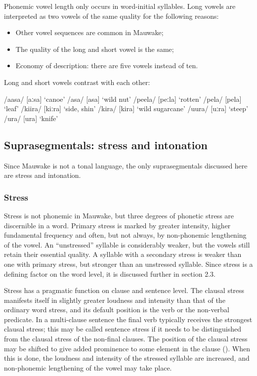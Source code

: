 Phonemic vowel length only occurs in word-initial syllables.  Long vowels are interpreted as two vowels of the same quality for the following reasons:


\begin{itemize}
\item Other vowel sequences are common in Mauwake;
\item The quality of the long and short vowel is the same;
\item Economy of description: there are five vowels instead of ten.
\end{itemize}

Long and short vowels contrast with each other:

\ea
\ea
/aasa/  [{{\textprimstress}aːsa}]  `canoe'
\ex
/asa/  [a{{\textprimstress}sa}]  `wild  nut'
\ex
/peela/  [{{\textprimstress}peːla}]  `rotten'
\ex
/pela/  [pe{{\textprimstress}la}]  `leaf'
\ex
/kiira/  [{{\textprimstress}kiːr}a]  `side, shin'
\ex
/kira/  [ki{{\textprimstress}ra}]  `wild sugarcane'
\ex
/{\textphi}uura/  [{{\textprimstress}}{\textphi}uːra]  `steep'
\ex
/{\textphi}ura/  [{\textphi}u{{\textprimstress}ra}]  `knife'
\z
\z

\subsection{Suprasegmentals: stress and intonation}\label{sec:2:y:x}


Since Mauwake is not a tonal language, the only suprasegmentals discussed here are stress and intonation.

\subsubsection{Stress}\label{sec:2:z:y:x}


Stress is not phonemic in Mauwake, but three degrees of phonetic stress are discernible in a word.  Primary stress is marked by greater intensity, higher fundamental frequency and often, but not always, by non-phonemic lengthening of the vowel.  An ``unstressed'' syllable is considerably weaker, but the vowels still retain their essential quality.  A syllable with a secondary stress is weaker than one with primary stress, but stronger than an unstressed syllable. Since stress is a defining factor on the word level, it is discussed further in section 2.3.

Stress has a pragmatic function on clause and sentence level. The clausal stress manifests itself in slightly greater loudness and intensity than that of the ordinary word stress, and its default position is the verb or the non-verbal predicate. In a multi-clause sentence the final verb typically receives the strongest clausal stress; this may be called sentence stress if it needs to be distinguished from the clausal stress of the non-final clauses. The position of the clausal stress may be shifted to give added prominence to some element in the clause (). When this is done, the loudness and intensity of the stressed syllable are increased, and non-phonemic lengthening of the vowel may take place.

